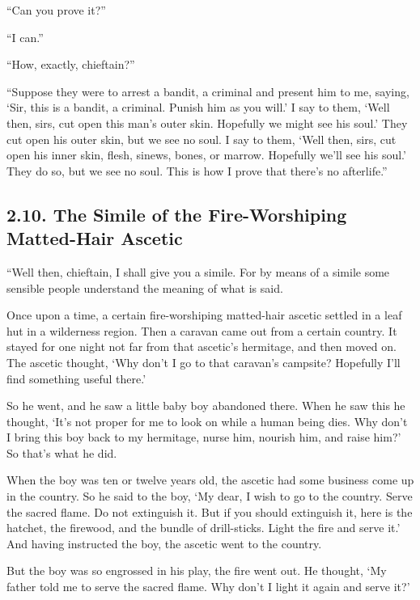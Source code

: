 \documentclass[12pt,openany]{book}%
\begin{document}
“Can you prove it?” 

“I can.” 

“How, exactly, chieftain?” 

“Suppose they were to arrest a bandit, a criminal and present him to me, saying, ‘Sir, this is a bandit, a criminal. Punish him as you will.’ I say to them, ‘Well then, sirs, cut open this man’s outer skin. Hopefully we might see his soul.’ They cut open his outer skin, but we see no soul. I say to them, ‘Well then, sirs, cut open his inner skin, flesh, sinews, bones, or marrow. Hopefully we’ll see his soul.’ They do so, but we see no soul. This is how I prove that there’s no afterlife.” 

\subsection*{2.10. The Simile of the Fire-Worshiping Matted-Hair Ascetic }

“Well then, chieftain, I shall give you a simile. For by means of a simile some sensible people understand the meaning of what is said. 

Once upon a time, a certain fire-worshiping matted-hair ascetic settled in a leaf hut in a wilderness region. Then a caravan came out from a certain country. It stayed for one night not far from that ascetic’s hermitage, and then moved on. The ascetic thought, ‘Why don’t I go to that caravan’s campsite? Hopefully I’ll find something useful there.’ 

So he went, and he saw a little baby boy abandoned there. When he saw this he thought, ‘It’s not proper for me to look on while a human being dies. Why don’t I bring this boy back to my hermitage, nurse him, nourish him, and raise him?’ So that’s what he did. 

When the boy was ten or twelve years old, the ascetic had some business come up in the country. So he said to the boy, ‘My dear, I wish to go to the country. Serve the sacred flame. Do not extinguish it. But if you should extinguish it, here is the hatchet, the firewood, and the bundle of drill-sticks. Light the fire and serve it.’ And having instructed the boy, the ascetic went to the country. 

But the boy was so engrossed in his play, the fire went out. He thought, ‘My father told me to serve the sacred flame. Why don’t I light it again and serve it?’ 
\end{document}
